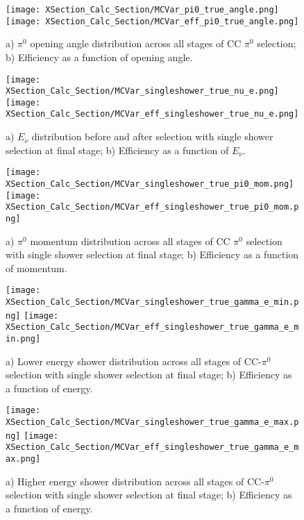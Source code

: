 \documentclass{article}
\begin{document}
\begin{figure}[h!]
\texttt{[image: XSection\_Calc\_Section/MCVar\_pi0\_true\_angle.png]}
\hspace{3 mm}
\texttt{[image: XSection\_Calc\_Section/MCVar\_eff\_pi0\_true\_angle.png]}
\caption{a) $\pi^0$ opening angle distribution across all stages of CC $\pi^0$ selection; b) Efficiency as a function of opening angle. }
\label{fig:pi0_effs_6}
\end{figure}



\begin{figure}[h!]
\centering
\texttt{[image: XSection\_Calc\_Section/MCVar\_singleshower\_true\_nu\_e.png]}
\hspace{1 mm}
\texttt{[image: XSection\_Calc\_Section/MCVar\_eff\_singleshower\_true\_nu\_e.png]}
\caption{a) $E_\nu$ distribution before and after selection with single shower selection at final stage; b) Efficiency as a function of $E_\nu$. }
\label{fig:pi0_effs_7}
\end{figure}

\begin{figure}[h!]
\centering
\texttt{[image: XSection\_Calc\_Section/MCVar\_singleshower\_true\_pi0\_mom.png]}
\hspace{1 mm}
\texttt{[image: XSection\_Calc\_Section/MCVar\_eff\_singleshower\_true\_pi0\_mom.png]}
\caption{a) $\pi^0$ momentum distribution across all stages of CC $\pi^0$ selection with single shower selection at final stage; b) Efficiency as a function of momentum. }
\label{fig:pi0_effs_8}
\end{figure}

\begin{figure}[h!]
\centering
\texttt{[image: XSection\_Calc\_Section/MCVar\_singleshower\_true\_gamma\_e\_min.png]}
\hspace{1 mm}
\texttt{[image: XSection\_Calc\_Section/MCVar\_eff\_singleshower\_true\_gamma\_e\_min.png]}
\caption{a) Lower energy shower distribution across all stages of CC-$\pi^0$ selection with single shower selection at final stage; b) Efficiency as a function of energy. }
\label{fig:pi0_effs_9}
\end{figure}

\begin{figure}[h!]
\centering
\texttt{[image: XSection\_Calc\_Section/MCVar\_singleshower\_true\_gamma\_e\_max.png]}
\hspace{1 mm}
\texttt{[image: XSection\_Calc\_Section/MCVar\_eff\_singleshower\_true\_gamma\_e\_max.png]}
\caption{a) Higher energy shower distribution across all stages of CC-$\pi^0$ selection with single shower selection at final stage; b) Efficiency as a function of energy. }
\label{fig:pi0_effs_10}
\end{figure}
\end{document}
